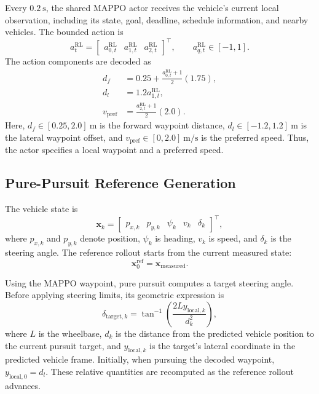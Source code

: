 \documentclass[letterpaper,10pt,conference]{ieeeconf}
\begin{document}
Every $0.2~\mathrm{s}$, the shared MAPPO actor receives the vehicle's current
local observation, including its state, goal, deadline, schedule information,
and nearby vehicles. The bounded action is
\begin{equation}
    a_t^{\mathrm{RL}}
    = \begin{bmatrix}
        a_{0,t}^{\mathrm{RL}} & a_{1,t}^{\mathrm{RL}} & a_{2,t}^{\mathrm{RL}}
      \end{bmatrix}^{\!\top},
    \qquad a_{q,t}^{\mathrm{RL}}\in[-1,1].
\end{equation}
The action components are decoded as
\begin{align}
    d_f &= 0.25 + \frac{a_{0,t}^{\mathrm{RL}}+1}{2}(1.75),\\
    d_l &= 1.2a_{1,t}^{\mathrm{RL}},\\
    v_{\mathrm{pref}} &= \frac{a_{2,t}^{\mathrm{RL}}+1}{2}(2.0).
\end{align}
Here, $d_f\in[0.25,2.0]~\mathrm{m}$ is the forward waypoint distance,
$d_l\in[-1.2,1.2]~\mathrm{m}$ is the lateral waypoint offset, and
$v_{\mathrm{pref}}\in[0,2.0]~\mathrm{m/s}$ is the preferred speed.
Thus, the actor specifies a local waypoint and a preferred speed.

\subsection{Pure-Pursuit Reference Generation}

The vehicle state is
\begin{equation}
    \mathbf{x}_k
    = \begin{bmatrix}
        p_{x,k} & p_{y,k} & \psi_k & v_k & \delta_k
      \end{bmatrix}^{\!\top},
\end{equation}
where $p_{x,k}$ and $p_{y,k}$ denote position, $\psi_k$ is heading,
$v_k$ is speed, and $\delta_k$ is the steering angle.
The reference rollout starts from the current measured state:
\begin{equation}
    \mathbf{x}^{\mathrm{ref}}_0 = \mathbf{x}_{\mathrm{measured}}.
\end{equation}

Using the MAPPO waypoint, pure pursuit computes a target steering angle.
Before applying steering limits, its geometric expression is
\begin{equation}
    \delta_{\mathrm{target},k}
    = \tan^{-1}\!\left(\frac{2L y_{\mathrm{local},k}}{d_k^2}\right),
\end{equation}
where $L$ is the wheelbase, $d_k$ is the distance from the predicted vehicle
position to the current pursuit target, and $y_{\mathrm{local},k}$ is the
target's lateral coordinate in the predicted vehicle frame. Initially,
when pursuing the decoded waypoint, $y_{\mathrm{local},0}=d_l$. These
relative quantities are recomputed as the reference rollout advances.
\end{document}
